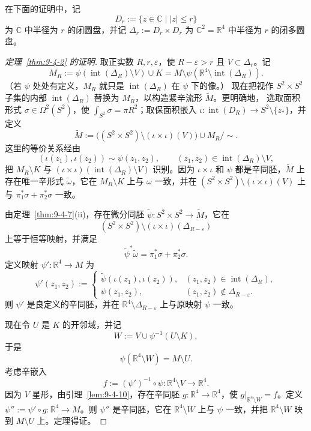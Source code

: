 在下面的证明中，记
\[
  D_r:=\{z\in\mathbb C\mid |z|\le r\}
\]
为 $\mathbb C$ 中半径为 $r$ 的闭圆盘，并记
$\Delta_r:=D_r\times D_r$ 为
$\mathbb C^2=\mathbb R^4$ 中半径为 $r$ 的闭多圆盘。

\begin{proof}[定理~\ref{thm:9-4-2} 的证明]
取正实数 $R,r,\varepsilon$，使 $R-\varepsilon>r$ 且 $V\subset\Delta_r$。记
\[
  M_R:=\psi(\operatorname{int}(\Delta_R)\setminus V)\cup K
  =M\setminus\psi(\mathbb R^4\setminus\operatorname{int}(\Delta_R)).
\]
（若 $\psi$ 处处有定义，$M_R$ 就只是 $\operatorname{int}(\Delta_R)$ 在 $\psi$ 下的像。）
现在把视作 $S^2\times S^2$ 子集的内部
$\operatorname{int}(\Delta_R)$ 替换为 $M_R$，以构造紧辛流形 $\widetilde M$。更明确地，
选取面积形式 $\sigma\in\Omega^2(S^2)$，使
$\int_{S^2}\sigma=\pi R^2$；取保面积嵌入
$\iota:\operatorname{int}(D_R)\to S^2\setminus\{z_*\}$，并定义
\[
  \widetilde M:=
  \bigl((S^2\times S^2)\setminus(\iota\times\iota)(V)\bigr)
  \cup M_R\big/\sim.
\]
这里的等价关系经由
\[
  (\iota(z_1),\iota(z_2))\sim\psi(z_1,z_2),
  \qquad
  (z_1,z_2)\in\operatorname{int}(\Delta_R)\setminus V,
\]
把 $M_R\setminus K$ 与
$(\iota\times\iota)(\operatorname{int}(\Delta_R)\setminus V)$ 识别。因为
$\iota\times\iota$ 和 $\psi$ 都是辛同胚，$\widetilde M$ 上存在唯一辛形式
$\widetilde\omega$，它在 $M_R\setminus K$ 上与 $\omega$ 一致，并在
$(S^2\times S^2)\setminus(\iota\times\iota)(V)$ 上与
$\pi_1^*\sigma+\pi_2^*\sigma$ 一致。

由定理~\ref{thm:9-4-7}(ii)，存在微分同胚
$\widetilde\psi:S^2\times S^2\to\widetilde M$，它在
\[
  (S^2\times S^2)\setminus(\iota\times\iota)(\Delta_{R-\varepsilon})
\]
上等于恒等映射，并满足
\[
  \widetilde\psi^*\widetilde\omega
  =\pi_1^*\sigma+\pi_2^*\sigma.
\]
定义映射 $\psi':\mathbb R^4\to M$ 为
\[
  \psi'(z_1,z_2):=
  \begin{cases}
    \widetilde\psi(\iota(z_1),\iota(z_2)),
      &(z_1,z_2)\in\operatorname{int}(\Delta_R),\\
    \psi(z_1,z_2),&(z_1,z_2)\notin\Delta_{R-\varepsilon}.
  \end{cases}
\]
则 $\psi'$ 是良定义的辛同胚，并在
$\mathbb R^4\setminus\Delta_{R-\varepsilon}$ 上与原映射 $\psi$ 一致。

现在令 $U$ 是 $K$ 的开邻域，并记
\[
  W:=V\cup\psi^{-1}(U\setminus K),
\]
于是
\[
  \psi(\mathbb R^4\setminus W)=M\setminus U.
\]
考虑辛嵌入
\[
  f:=(\psi')^{-1}\circ\psi:
  \mathbb R^4\setminus V\longrightarrow\mathbb R^4.
\]
因为 $V$ 星形，由引理~\ref{lem:9-4-10}，存在辛同胚
$g:\mathbb R^4\to\mathbb R^4$，使
$g|_{\mathbb R^4\setminus W}=f$。定义
$\psi'':=\psi'\circ g:\mathbb R^4\to M$。则 $\psi''$ 是辛同胚，它在
$\mathbb R^4\setminus W$ 上与 $\psi$ 一致，并把
$\mathbb R^4\setminus W$ 映到 $M\setminus U$ 上。定理得证。
\end{proof}

